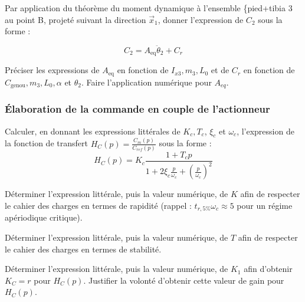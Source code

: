 \documentclass[11pt]{article}
\begin{document}
\UPSTIquestion Par application du théorème du moment dynamique à l'ensemble \{pied+tibia 3 au point B, projeté suivant la direction $\vec{x}_{1}$, donner l'expression de $C_{2}$ sous la forme :

$$
C_{2}=A_{\mathrm{eq}} \ddot{\theta}_{2}+C_{r}
$$

Préciser les expressions de $A_{\textrm{eq}}$ en fonction de $I_{x 3}, m_{3}, L_{0}$ et de $C_{r}$ en fonction de $C_{\textrm{genou}}, m_{3}, L_{0}, \alpha$ et $\theta_{2}$. Faire l'application numérique pour $A_{e q}$.
\begin{UPSTIcorrige}

\end{UPSTIcorrige}


\subsubsection{Élaboration de la commande en couple de l'actionneur}

\UPSTIquestion  Calculer, en donnant les expressions littérales de $K_{c}, T_{c}$, $\xi_{c}$ et $\omega_{c}$, l'expression de la fonction de transfert $H_{C}(p)=\frac{C_{m}(p)}{C_{r e f}(p)}$ sous la forme :
$$
H_{C}(p)=K_{c} \frac{1+T_{c} p}{1+2 \xi_{c} \frac{p}{\omega_{c}}+\left(\frac{p}{\omega_{c}}\right)^{2}}
$$
\begin{UPSTIcorrige}

\end{UPSTIcorrige}

\UPSTIquestion Déterminer l'expression littérale, puis la valeur numérique, de $K$ afin de respecter le cahier des charges en termes de rapidité (rappel : $t_{r, 5 \%} \omega_{c} \approx 5$ pour un régime apériodique critique).
\begin{UPSTIcorrige}

\end{UPSTIcorrige}

\UPSTIquestion Déterminer l'expression littérale, puis la valeur numérique, de $T$ afin de respecter le cahier des charges en termes de stabilité.
\begin{UPSTIcorrige}

\end{UPSTIcorrige}

\UPSTIquestion  Déterminer l'expression littérale, puis la valeur numérique, de $K_{1}$ afin d'obtenir $K_{C}=r$ pour $H_{C}(p)$. Justifier la volonté d'obtenir cette valeur de gain pour $H_{C}(p)$.
\begin{UPSTIcorrige}

\end{UPSTIcorrige}
\end{document}
